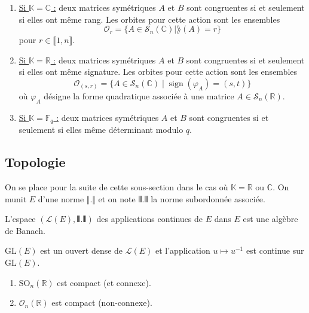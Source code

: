 	\begin{theorem}
		\begin{enumerate}[label=(\roman*)]
			\item \underline{Si $\mathbb{K} = \mathbb{C}$ :} deux matrices symétriques $A$ et $B$ sont congruentes si et seulement si elles ont même rang. Les orbites pour cette action sont les ensembles
			\[ \mathcal{O}_r = \{ A \in \mathcal{S}_n(\mathbb{C}) \mid \rang(A) = r \} \]
			pour $r \in \llbracket 1, n \rrbracket$.
			\item \underline{Si $\mathbb{K} = \mathbb{R}$ :} deux matrices symétriques $A$ et $B$ sont congruentes si et seulement si elles ont même signature. Les orbites pour cette action sont les ensembles
			\[ \mathcal{O}_(s,r) = \{ A \in \mathcal{S}_n(\mathbb{C}) \mid \operatorname{sign}(\varphi_A) = (s,t) \} \]
			où $\varphi_A$ désigne la forme quadratique associée à une matrice $A \in \mathcal{S}_n(\mathbb{R})$.
			\item \underline{Si $\mathbb{K} = \mathbb{F}_q$ :} deux matrices symétriques $A$ et $B$ sont congruentes si et seulement si elles même déterminant modulo $q$.
		\end{enumerate}
	\end{theorem}
	
	\subsection{Topologie}
	
	\reference{159}
	
	On se place pour la suite de cette sous-section dans le cas où $\mathbb{K} = \mathbb{R}$ ou $\mathbb{C}$. On munit $E$ d'une norme $\Vert . \Vert$ et on note $\VERT . \VERT$ la norme subordonnée associée.
	
	\begin{proposition}
		L'espace $(\mathcal{L}(E), \VERT . \VERT)$ des applications continues de $E$ dans $E$ est une algèbre de Banach.
	\end{proposition}
	
	\begin{theorem}
		$\mathrm{GL}(E)$ est un ouvert dense de $\mathcal{L}(E)$ et l'application $u \mapsto u^{-1}$ est continue sur $\mathrm{GL}(E)$.
	\end{theorem}
	
	\reference[C-G]{62}
	
	\begin{proposition}
		\begin{enumerate}[label=(\roman*)]
			\item $\mathrm{SO}_n(\mathbb{R})$ est compact (et connexe).
			\item $\mathcal{O}_n(\mathbb{R})$ est compact (non-connexe).
		\end{enumerate}
	\end{proposition}
	
